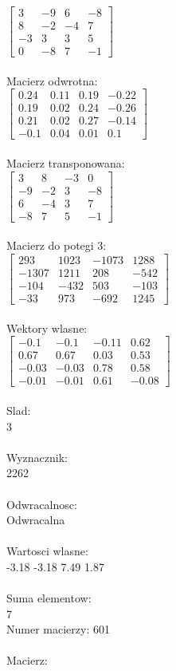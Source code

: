 \documentclass[a4paper,12pt]{article}
\begin{document}
$\begin{bmatrix} 3&-9&6&-8\\8&-2&-4&7\\-3&3&3&5\\0&-8&7&-1 \end{bmatrix}$
\\
\\
Macierz odwrotna:\\

$\begin{bmatrix} 0.24&0.11&0.19&-0.22\\0.19&0.02&0.24&-0.26\\0.21&0.02&0.27&-0.14\\-0.1&0.04&0.01&0.1 \end{bmatrix}$
\\
\\
Macierz transponowana:\\

$\begin{bmatrix} 3&8&-3&0\\-9&-2&3&-8\\6&-4&3&7\\-8&7&5&-1 \end{bmatrix}$
\\
\\
Macierz do potegi 3:\\

$\begin{bmatrix} 293&1023&-1073&1288\\-1307&1211&208&-542\\-104&-432&503&-103\\-33&973&-692&1245 \end{bmatrix}$
\\
\\
Wektory wlasne:\\

$\begin{bmatrix} -0.1&-0.1&-0.11&0.62\\0.67&0.67&0.03&0.53\\-0.03&-0.03&0.78&0.58\\-0.01&-0.01&0.61&-0.08 \end{bmatrix}$
\\
\\
Slad:\\
3
\\
\\
Wyznacznik:\\
2262
\\
\\
Odwracalnosc:\\
Odwracalna
\\
\\
Wartosci wlasne:\\
-3.18 -3.18 7.49 1.87
\\
\\
Suma elementow:\\
7
\\
\newpage
Numer macierzy:
601
\\
\\
Macierz:\\
\end{document}
